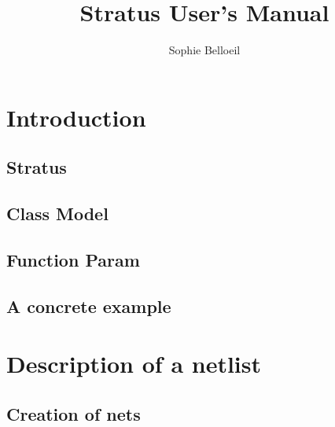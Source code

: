 \documentclass[12pt]{article}
\date   {}
\title  {Stratus User's Manual}
\author {Sophie Belloeil}
\begin{document}
\setlength{\footrulewidth}{0.6pt}
\maketitle


\tableofchildlinks
\htmlrule

\section{Introduction}
\label{secintroduction}

    \subsection{Stratus}
    \label{secstratus}
    
    \subsection{Class Model}
    \label{secmodel}
    
    \subsection{Function Param}
    \label{secparam}
    
    \subsection{A concrete example}
    \label{secexample}
    
   
\newpage 
\section{Description of a netlist}
\label{secnetlist}
    
    \subsection{Creation of nets}
    \label{secnet}
    
\end{document}
